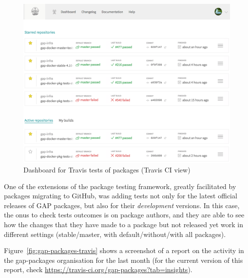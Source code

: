 \documentclass{deliverablereport}
\begin{document}
\begin{figure}[!ht]
    \centering
    \includegraphics[width=\textwidth]{images/gap-infra-travis}
    \caption{Dashboard for Travis tests of \GAP packages (Travis CI view)}
    \label{fig:gap-infra-travis}
\end{figure}

One of the extensions of the package testing framework, greatly 
facilitated by packages migrating to GitHub, was adding tests not
only for the latest official releases of GAP packages, but also
for their \emph{development} versions.
In this case, the onus to check tests outcomes is on package authors,
and they are able to see how the changes that they have made to
a package but not released yet work in different settings (stable/master,
with default/without/with all packages).

Figure~\ref{fig:gap-packages-travis} shows a screenshot of a 
report on the activity in the gap-packages organisation 
for the last month (for the current version of 
this report, check \url{https://travis-ci.org/gap-packages?tab=insights}).
\end{document}
